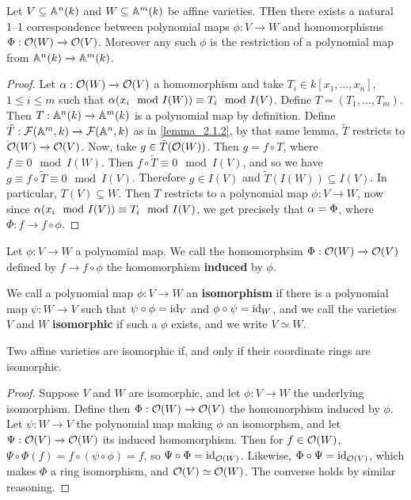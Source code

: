 \begin{theorem}\label{theorem_2.1.4}
  Let $V \subseteq \mathbb{A}^n(k)$ and $W \subseteq \mathbb{A}^m(k)$ be affine varieties. THen
  there exists a natural 1--1 correspondence between polynomial maps
  $\phi:V \xrightarrow{} W$ and homomorphisms $\Phi:\mathcal{O}(W) \xrightarrow{} \mathcal{O}(V)$.
  Moreover any such $\phi$ is the restriction of a polynomial map from
  $\mathbb{A}^n(k) \xrightarrow{} \mathbb{A}^m(k)$.
\end{theorem}
\begin{proof}
  Let $\alpha:\mathcal{O}(W) \xrightarrow{} \mathcal{O}(V)$ a homomorphism and take $T_i \in
  k[x_1, \dots, x_n]$, $1 \leq i \leq m$ such that $\alpha(x_i \mod{I(W)}) \equiv
  T_i \mod{I(V)}$. Define $T=(T_1, \dots, T_m)$. Then $T:\mathbb{A}^n(k) \xrightarrow{}
  \mathbb{A}^m(k)$ is a polynomial map by definition. Define $\tilde{T}:\mathcal{F}(\mathbb{A}^m,k)
  \xrightarrow{} \mathcal{F}(\mathbb{A}^n,k)$ as in \ref{lemma_2.1.2}, by that same lemma,
  $\tilde{T}$ restricts to $\mathcal{O}(W) \xrightarrow{} \mathcal{O}(V)$. Now, take $g \in
  \tilde{T}(\mathcal{O}(W))$. Then $g=f \circ T$, where $f \equiv 0 \mod{I(W)}$. Then $f
  \circ \tilde{T} \equiv 0 \mod{I(V)}$, and so we have $g \equiv  f \circ \tilde{T}
  \equiv 0 \mod{I(V)}$. Therefore $g \in I(V)$ and $\tilde{T}(I(W)) \subseteq
  I(V)$. In particular, $T(V) \subseteq W$. Then $T$ restricts to a polynomial
  map  $\phi:V \xrightarrow{} W$, now since $\alpha(x_i \mod{I(V)}) \equiv
  T_i \mod{I(V)}$, we get precisely that $\alpha=\Phi$, where $\Phi:f \xrightarrow{}
  f \circ \phi$.
\end{proof}

\begin{definition}
  Let $\phi:V \xrightarrow{} W$ a polynomial map. We call the homomorphsim
  $\Phi:\mathcal{O}(W) \xrightarrow{} \mathcal{O}(V)$ defined by $f \xrightarrow{} f \circ \phi$
  the homomorphism \textbf{induced} by $\phi$.
\end{definition}

\begin{definition}
  We call a polynomial map $\phi:V \xrightarrow{} W$ an \textbf{isomorphism} if
  there is a polynomial map $\psi:W \xrightarrow{} V$ such that $\psi \circ
  \phi=\operatorname{id}_V$ and  $\phi \circ \psi=\operatorname{id}_W$, and we call the varieties $V$ and
  $W$  \textbf{isomorphic} if such a $\phi$ exists, and we write  $V \simeq W$.
\end{definition}

\begin{lemma}\label{lemma_2.1.5}
  Two affine varieties are isomorphic if, and only if their coordinate rings are
  isomorphic.
\end{lemma}
\begin{proof}
  Suppose $V$ and $W$ are isomorphic, and let $\phi:V \xrightarrow{} W$ the
  underlying isomorphism. Define then $\Phi:\mathcal{O}(W) \xrightarrow{} \mathcal{O}(V)$ the
  homomorphism induced by $\phi$. Let $\psi:W \xrightarrow{} V$ the polynomial
  map making $\phi$ an isomorphsm, and let $\Psi:\mathcal{O}(V) \xrightarrow{} \mathcal{O}(W)$
  its induced homomorphism. Then for $f \in \mathcal{O}(W)$, $\Psi \circ \Phi(f)=f \circ
  (\psi \circ \phi)=f$, so $\Psi \circ \Phi=\operatorname{id}_{\mathcal{O}(W)}$. Likewise, $\Phi \circ
  \Psi=\operatorname{id}_{\mathcal{O}(V)}$, which makes $\Phi$ a ring isomorphism, and $\mathcal{O}(V) \simeq
  \mathcal{O}(W)$. The converse holds by similar reasoning.
\end{proof}
